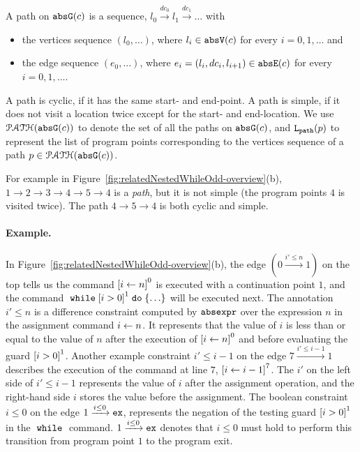 \begin{defn}[Path]
 \label{def:abs_cfgpath} 
 A path on $\mathtt{abs}{\mathtt{G}}(c)$ is a sequence, $ l_0 \xrightarrow{dc_0} l_1 \xrightarrow{dc_1} \ldots $ with
 \begin{itemize}
 \item the vertices sequence $(l_0, \ldots)$, where $l_i \in \mathtt{abs}{\mathtt{V}}(c)$ for every $i = 0, 1, \ldots$ and
 \item the edge sequence $(e_0, \ldots)$, where $e_i = (l_{i}, dc_i, l_{i + 1}) \in \mathtt{abs}{\mathtt{E}}(c)$ for every $i = 0, 1, \ldots$.
 \end{itemize}
 A path is cyclic, if it has the same start- and end-point. A path is simple, if it does not visit a location twice except for the start- and end-location. We use $\mathcal{PATH}(\mathtt{abs}{\mathtt{G}}(c))$ to denote the set of all the paths on $\mathtt{abs}{\mathtt{G}}(c)$,
 and $\mathtt{L}_{\mathtt{path}}(p)$ to represent the list of program points corresponding to the vertices sequence of a path $p \in \mathcal{PATH}(\mathtt{abs}{\mathtt{G}}(c))$.
 \end{defn}
 For example in Figure~\ref{fig:relatedNestedWhileOdd-overview}(b), $1 \to 2 \to 3 \to 4 \to 5 \to 4$ is a \emph{path}, but it is not simple (the program points $4$ is visited twice). The path $4 \to 5 \to 4$ is both cyclic and simple.

\paragraph{Example.}
In Figure~\ref{fig:relatedNestedWhileOdd-overview}(b),
the edge $(0 \xrightarrow{i' \leq n} 1)$ on the top tells us the command 
$\clabel{\assign{i}{n}}^0$ is executed with a continuation point $1$, and the
command $\ewhile \clabel{i > 0}^1 \edo \{\ldots\}$ will be executed next.
The annotation $i' \leq n$ is a difference constraint 
computed by $\mathtt{abs}{\mathtt{expr}}$ over
the expression $n$ in the assignment command $\mathrel{ i \leftarrow n }$.
It represents that the value of $i$ is less than or equal to the value of $n$ after the
execution of $\clabel{\assign{i}{n}}^0$ and before evaluating the guard $\clabel{i > 0}^1$.
Another example constraint $i' \leq i - 1$ on the edge $7 \xrightarrow{i' \leq i - 1} 1$
describes the execution of
 the command at line $7$, 
$\clabel{\assign{i}{i - 1}}^{7}$. 
The $i'$ on the left side of $i' \leq i - 1$ represents the value of $i$ after the assignment operation,
and the right-hand side $i$ stores the value before the assignment.
The boolean constraint $i \leq 0 $ on the edge $1 \xrightarrow{i \leq 0} \mathtt{ex}$, 
represents the negation of the testing guard $\clabel{i > 0}^1$
in the $\;\mathtt{while}\;$ command.
$1 \xrightarrow{i \leq 0} \mathtt{ex}$ denotes that $i \leq 0$ must hold to perform this transition from program point $1$ to
the program exit. 